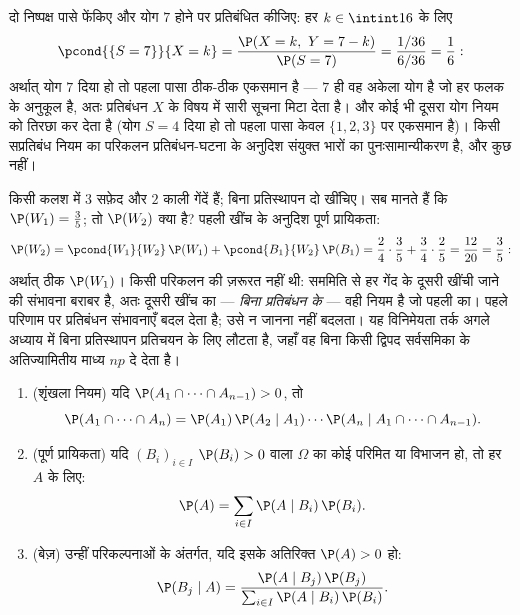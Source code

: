 \begin{example}\label{ex:b2:proba:sumseven}
दो निष्पक्ष पासे फेंकिए और योग $7$ होने पर प्रतिबंधित कीजिए: हर
$k \in \intint16$ के लिए
\[
\pcond{\{S = 7\}}{X = k}
= \frac{\P(X = k,\ Y = 7 - k)}{\P(S = 7)}
= \frac{1/36}{6/36} = \frac16 :
\]
अर्थात् योग $7$ दिया हो तो पहला पासा ठीक-ठीक एकसमान है --- $7$ ही
वह अकेला योग है जो हर फलक के अनुकूल है, अतः प्रतिबंधन $X$ के विषय
में सारी सूचना मिटा देता है। और कोई भी दूसरा योग नियम को तिरछा कर
देता है (योग $S = 4$ दिया हो तो पहला पासा केवल $\{1, 2, 3\}$ पर एकसमान है)।
किसी सप्रतिबंध नियम का परिकलन प्रतिबंधन-घटना के अनुदिश संयुक्त
भारों का पुनःसामान्यीकरण है, और कुछ नहीं।
\end{example}

\begin{example}[दूसरी खींच पहली जितनी ही अच्छी
है]\label{ex:b2:proba:seconddraw}
किसी कलश में $3$ सफ़ेद और $2$ काली गेंदें हैं; बिना प्रतिस्थापन
दो खींचिए। सब मानते हैं कि $\P(W_1) = \frac35$; तो $\P(W_2)$ क्या है? पहली खींच के
अनुदिश पूर्ण प्रायिकता:
\[
\P(W_2) = \pcond{W_1}{W_2}\,\P(W_1) +
\pcond{B_1}{W_2}\,\P(B_1)
= \frac24\cdot\frac35 + \frac34\cdot\frac25
= \frac{12}{20} = \frac35 :
\]
अर्थात् ठीक $\P(W_1)$। किसी परिकलन की ज़रूरत नहीं थी: सममिति से हर गेंद
के दूसरी खींची जाने की संभावना बराबर है, अतः दूसरी खींच का ---
\emph{बिना प्रतिबंधन के} --- वही नियम है जो पहली का। पहले परिणाम पर
प्रतिबंधन संभावनाएँ बदल देता है; उसे न जानना नहीं बदलता। यह
विनिमेयता तर्क अगले अध्याय में बिना प्रतिस्थापन प्रतिचयन के लिए
लौटता है, जहाँ वह बिना किसी द्विपद सर्वसमिका के अतिज्यामितीय माध्य
$np$ दे देता है।
\end{example}

\begin{theorem}[संयुक्त प्रायिकताएँ, पूर्ण प्रायिकता,
बेज़]\label{thm:b2:proba:bayes}
\leavevmode
\begin{enumerate}
\item (शृंखला नियम) यदि $\P(A_1 \cap \dots \cap A_{n-1}) > 0$, तो
\[
\P(A_1 \cap \dots \cap A_n)
= \P(A_1)\,\P(A_2 \mid A_1)\cdots
\P(A_n \mid A_1 \cap \dots \cap A_{n-1}) .
\]
\item (पूर्ण प्रायिकता) यदि $(B_i)_{i \in I}$ $\P(B_i) > 0$ वाला $\Omega$ का कोई परिमित या
 विभाजन हो, तो हर  $A$ के लिए:
\[
\P(A) = \sum_{i \in I} \P(A \mid B_i)\,\P(B_i) .
\]
\item (बेज़) उन्हीं परिकल्पनाओं के अंतर्गत, यदि इसके अतिरिक्त $\P(A) > 0$
हो:
\[
\P(B_j \mid A)
= \frac{\P(A \mid B_j)\,\P(B_j)}
       {\sum_{i \in I} \P(A \mid B_i)\,\P(B_i)} .
\]
\end{enumerate}
\end{theorem}

